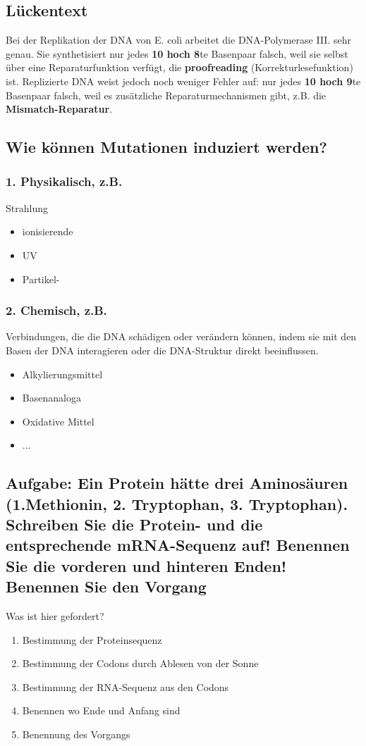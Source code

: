 \documentclass{article}
\begin{document}
\subsection*{Lückentext}
Bei der Replikation der DNA von E. coli arbeitet die DNA-Polymerase III. sehr genau. Sie synthetisiert nur jedes \textbf{10 hoch 8}te Basenpaar falsch, weil sie selbst über eine Reparaturfunktion verfügt, die \textbf{proofreading} (Korrekturlesefunktion) ist. \newline
Replizierte DNA weist jedoch noch weniger Fehler auf: nur jedes \textbf{10 hoch 9}te Basenpaar falsch, weil es zusätzliche Reparaturmechanismen gibt, z.B. die \textbf{Mismatch-Reparatur}.

\subsection*{Wie können Mutationen induziert werden?}
\subsubsection*{1. Physikalisch, z.B.} 
    Strahlung
    \begin{itemize}
    \item ionisierende
    \item UV
    \item Partikel-
\end{itemize}
\subsubsection*{2. Chemisch, z.B.} 
Verbindungen, die die DNA schädigen oder verändern können, indem sie mit den Basen der DNA interagieren oder die DNA-Struktur direkt beeinflussen. 
\begin{itemize}
    \item Alkylierungsmittel
    \item Basenanaloga
    \item Oxidative Mittel
    \item ...
\end{itemize}
\subsection*{Aufgabe: Ein Protein hätte drei Aminosäuren (1.Methionin, 2. Tryptophan, 3. Tryptophan). Schreiben Sie die Protein- und die entsprechende mRNA-Sequenz auf! Benennen Sie
die vorderen und hinteren Enden! Benennen Sie den Vorgang}
Was ist hier gefordert? 
\begin{enumerate}
    \item Bestimmung der Proteinsequenz 
    \item Bestimmung der Codons durch Ablesen von der Sonne 
    \item Bestimmung der RNA-Sequenz aus den Codons
    \item Benennen wo Ende und Anfang sind
    \item Benennung des Vorgangs
\end{enumerate}
\end{document}
